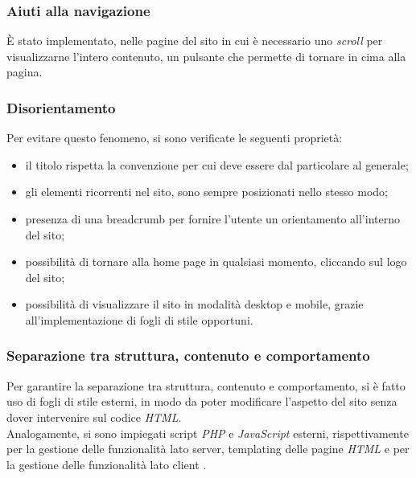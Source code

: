 \subsubsection{Aiuti alla navigazione}
\label{subsubsec:accessibility-navigation}
È stato implementato, nelle pagine del sito in cui è necessario uno \textit{scroll} per visualizzarne l'intero contenuto, un pulsante che permette di tornare in cima alla pagina.

\subsubsection{Disorientamento}
\label{subsubsec:accessibility-disorientation}
Per evitare questo fenomeno, si sono verificate le seguenti proprietà:
\begin{itemize}
    \item il titolo rispetta la convenzione per cui deve essere dal particolare al generale;
    \item gli elementi ricorrenti nel sito, sono sempre posizionati nello stesso modo;
    \item presenza di una breadcrumb per fornire l'utente un orientamento all'interno del sito;
    \item possibilità di tornare alla home page in qualsiasi momento, cliccando sul logo del sito;
    \item possibilità di visualizzare il sito in modalità desktop e mobile, grazie all'implementazione di fogli di stile opportuni.
\end{itemize}

\subsubsection{Separazione tra struttura, contenuto e comportamento}
\label{subsubsec:accessibility-separation}
Per garantire la separazione tra struttura, contenuto e comportamento, si è fatto uso di fogli di stile esterni, in modo da poter modificare l'aspetto del sito senza dover intervenire sul codice \textit{HTML}. \\
Analogamente, si sono impiegati script \textit{PHP} e \textit{JavaScript} esterni, rispettivamente per la gestione delle funzionalità lato server, templating delle pagine \textit{HTML} e per la gestione delle funzionalità lato client .